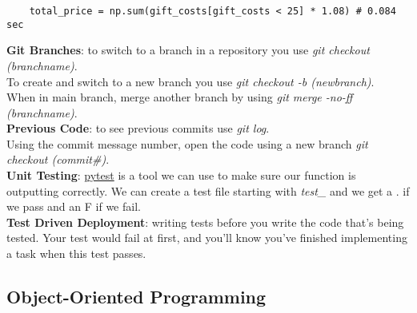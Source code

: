 \documentclass[11pt, a4paper]{article}
\begin{document}
\begin{spacing}{1.1}
\begin{lstlisting}
	total_price = np.sum(gift_costs[gift_costs < 25] * 1.08) # 0.084 sec
	\end{lstlisting} \vspace*{2mm}
	\textbf{Git Branches}: to switch to a branch in a repository you use \textit{git checkout (branchname)}.\\
	To create and switch to a new branch you use \textit{git checkout -b (newbranch)}.\\
	When in main branch, merge another branch by using \textit{git merge -no-ff (branchname)}.\vspace*{2mm}\\
	\textbf{Previous Code}: to see previous commits use \textit{git log}.\\
	Using the commit message number, open the code using a new branch \textit{git checkout (commit\#)}.\vspace*{2mm}\\
	\textbf{Unit Testing}: \href{https://docs.pytest.org/en/latest/getting-started.html}{pytest} is a tool we can use to make sure our function is outputting correctly. We can create a test file starting with \textit{test\_} and we get a . if we pass and an F if we fail.\vspace*{2mm}\\
	\textbf{Test Driven Deployment}: writing tests before you write the code that’s being tested. Your test would fail at first, and you’ll know you’ve finished implementing a task when this test passes.\vspace*{2mm}
	
	\subsection{Object-Oriented Programming}
	
	
	
	
	
	
	
\end{spacing}
\end{document}
